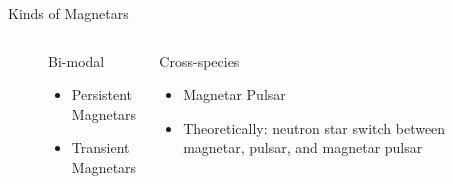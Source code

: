 \documentclass[hyperref=pdftex, presentation]{beamer}
\begin{document}
\begin{frame}{\Large Kinds of Magnetars}
	\begin{figure}
		\begin{columns}[c] %

			\begin{block}{Bi-modal}
				\begin{itemize}
					\item<1-> Persistent Magnetars
					\item<2-> Transient Magnetars
				\end{itemize}
			\end{block}
			\begin{block}{Cross-species}
				\begin{itemize}
 					\item<3-> Magnetar Pulsar%
 					\item<4-> Theoretically: neutron star switch between magnetar, pulsar, and magnetar pulsar
				\end{itemize}
			\end{block}
			

		\end{columns}
	\end{figure}
\end{frame}
\end{document}
